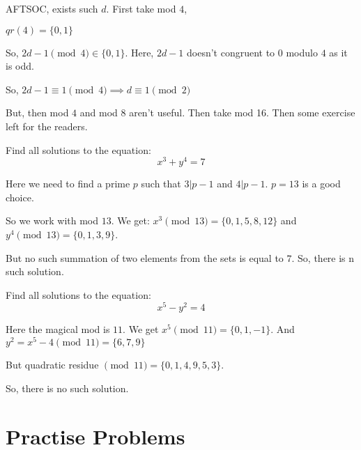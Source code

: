 AFTSOC, exists such $d$.  
First take mod $4$,

$qr(4)=\{0,1\}$

So, $2d-1 \pmod 4 \in \{0,1\}.$ Here, $2d-1$ doesn't congruent to 0 modulo $4$ as it is odd.

So, $2d-1 \equiv 1 \pmod 4 \implies d\equiv 1 \pmod 2$

But, then mod $4$ and mod $8$ aren't useful. Then take mod 16. Then some exercise left for the readers.


\begin{example}
Find all solutions to the equation:
\[x^3 + y^4 =7\]
\end{example}
Here we need to find a prime $p$ such that $3|p-1$ and $4|p-1$. 
$p=13 $ is a good choice.

So we work with mod $13$. We get:
$x^3 \pmod {13} =\{0,1,5,8,12\}$ and $y^4 \pmod {13} = \{0,1,3,9\}$.

But no such summation of two elements from the sets is equal to $7$. So, there is n such solution.

\begin{example}
Find all solutions to the equation:
$$x^5-y^2=4$$
\end{example}
Here the magical mod is $11$.
We get $x^5 \pmod {11} =\{0,1,-1\}$. And $y^2=x^5-4 \pmod {11} =\{6,7,9\}$

But quadratic residue $\pmod {11} =\{0,1,4,9,5,3\}$.

So, there is no such solution.

\section{Practise Problems}

\begin{problem}


	\begin{hint}
	\addhint{}
	\addhint{}
	\end{hint}
\end{problem}

\begin{problem}


	\begin{hint}
	\addhint{}
	\addhint{}
	\end{hint}
\end{problem}

